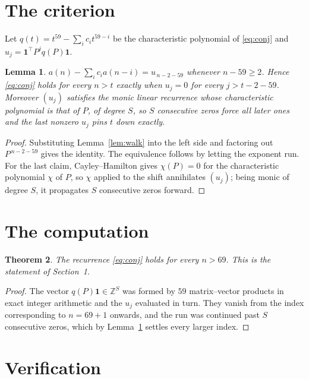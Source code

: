 \documentclass[11pt,a4paper]{article}
\theoremstyle{plain}
\newtheorem{theorem}{Theorem}
\newtheorem{lemma}[theorem]{Lemma}
\theoremstyle{definition}
\begin{document}
\section{The criterion}

Let $q(t)=t^{59}-\sum_i c_i t^{59-i}$ be the characteristic polynomial of
\eqref{eq:conj} and $u_j=\mathbf{1}^{\!\top}P^{j}q(P)\mathbf{1}$.

\begin{lemma}\label{lem:crit}
$a(n)-\sum_i c_i a(n-i)=u_{\,n-2-59}$ whenever $n-59\ge2$. Hence
\eqref{eq:conj} holds for every $n>t$ exactly when $u_j=0$ for every
$j>t-2-59$. Moreover $(u_j)$ satisfies the monic linear recurrence whose
characteristic polynomial is that of $P$, of degree $S$, so $S$ consecutive zeros force all
later ones and the last nonzero $u_j$ pins $t$ down exactly.
\end{lemma}

\begin{proof}
Substituting Lemma~\ref{lem:walk} into the left side and factoring out
$P^{\,n-2-59}$ gives the identity. The equivalence follows by letting the exponent
run. For the last claim, Cayley--Hamilton gives $\chi(P)=0$ for the characteristic
polynomial $\chi$ of $P$, so $\chi$ applied to the shift annihilates $(u_j)$; being monic of
degree $S$, it propagates $S$ consecutive zeros forward.
\end{proof}

\section{The computation}

\begin{theorem}
The recurrence \eqref{eq:conj} holds for every $n>69$. This is the statement of
Section~1.
\end{theorem}

\begin{proof}
The vector $q(P)\mathbf{1}\in\mathbb{Z}^{S}$ was formed by $59$ matrix--vector
products in exact integer arithmetic and the $u_j$ evaluated in turn. They vanish from the
index corresponding to $n=69+1$ onwards, and the run was continued past $S$ consecutive
zeros, which by Lemma~\ref{lem:crit} settles every larger index.
\end{proof}

\section{Verification}
\end{document}
